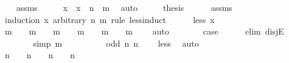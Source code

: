 \begin{isabellebody}
%
\isadelimproof
\ \ %
\endisadelimproof
%
\isatagproof
{}\isamarkupfalse%
\ assms\isanewline
{}\isamarkupfalse%
\ {\isacharminus}{\kern0pt}\isanewline
\ \ \isamarkupfalse%
\ x\ \ {\isachardoublequoteopen}x\ {\isacharequal}{\kern0pt}\ n\ {\isacharplus}{\kern0pt}\ m{\isachardoublequoteclose}\ \isamarkupfalse%
\ auto\isanewline
\ \ \isamarkupfalse%
\ \isamarkupfalse%
\ {\isacharquery}{\kern0pt}thesis\isanewline
\ \ \ \ \isamarkupfalse%
\ assms\isanewline
\ \ \isamarkupfalse%
\ {\isacharparenleft}{\kern0pt}induction\ x\ arbitrary{\isacharcolon}{\kern0pt}\ n\ m\ rule{\isacharcolon}{\kern0pt}\ less{\isacharunderscore}{\kern0pt}induct{\isacharparenright}{\kern0pt}\isanewline
\ \ \ \ \isamarkupfalse%
\ {\isacharparenleft}{\kern0pt}less\ x{\isacharparenright}{\kern0pt}\isanewline
\ \ \ \ \isamarkupfalse%
\ \isamarkupfalse%
\ {\isachardoublequoteopen}m\ {\isacharequal}{\kern0pt}\ {}\ {\isasymor}\ m\ {\isacharequal}{\kern0pt}\ {}\ {\isasymor}\ m\ {\isacharequal}{\kern0pt}\ {}\ {\isasymor}\ m\ {\isacharequal}{\kern0pt}\ {}\ {\isasymor}\ m\ {\isacharequal}{\kern0pt}\ {}\ {\isasymor}\ m\ {\isasymge}\ {}{}{\isachardoublequoteclose}\ \isamarkupfalse%
\ auto\isanewline
\ \ \ \ \isamarkupfalse%
\ \isamarkupfalse%
\ {\isacharquery}{\kern0pt}case\isanewline
\ \ \ \ \isamarkupfalse%
\ {\isacharparenleft}{\kern0pt}elim\ disjE{\isacharparenright}{\kern0pt}\isanewline
\ \ \ \ \ \ \isamarkupfalse%
\ {\isacharbrackleft}{\kern0pt}simp{\isacharbrackright}{\kern0pt}{\isacharcolon}{\kern0pt}\ {\isachardoublequoteopen}m\ {\isacharequal}{\kern0pt}\ {}{\isachardoublequoteclose}\isanewline
\ \ \ \ \ \ \isamarkupfalse%
\ {\isachardoublequoteopen}odd\ n{\isachardoublequoteclose}\ {\isachardoublequoteopen}n\ {\isasymge}\ {}{\isachardoublequoteclose}\ \isamarkupfalse%
\ less\ \isamarkupfalse%
\ auto\isanewline
\ \ \ \ \ \ \isamarkupfalse%
\ \isamarkupfalse%
\ {\isachardoublequoteopen}n\ {\isacharequal}{\kern0pt}\ {}\ {\isasymor}\ n\ {\isacharequal}{\kern0pt}\ {}\ {\isasymor}\ n\ {\isacharequal}{\kern0pt}\ {}\ {\isasymor}\ n{\isacharminus}{\kern0pt}{}\ {\isasymge}\ {}{\isachardoublequoteclose}\ \isamarkupfalse%

\end{isabellebody}
